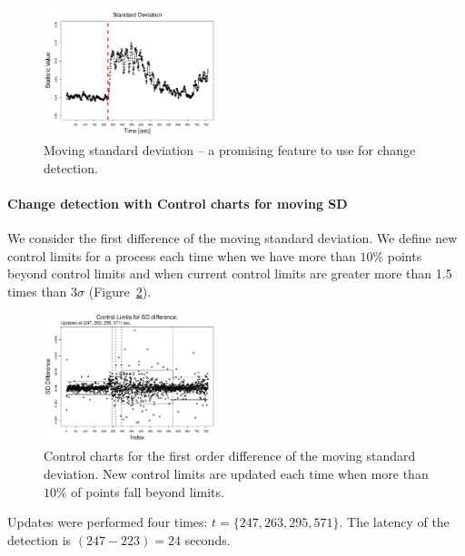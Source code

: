 \begin{figure}[htb!]
\includegraphics[width=0.45\textwidth]{articles/pics/cfb_paper/PSD/PSDsd}
\caption{Moving standard deviation -- a promising feature to use for change detection.}\label{figure9}
\end{figure}

\paragraph{Change detection with Control charts for moving SD}
We consider the first difference of the moving standard deviation.
We define new control limits for a process each time when we have more than $10\%$ points beyond control limits and
when current control limits are greater more than 1.5 times than $3\sigma$ (Figure~\ref{figure10}).

\begin{figure}[htb!]
\includegraphics[width=0.45\textwidth]{articles/pics/cfb_paper/PSD/PSDrunnqccSD}
\caption{Control charts for the first order difference of the moving standard deviation.
New control limits are updated each time when more than $10\%$ of points fall beyond limits.}\label{figure10}
\end{figure}

Updates were performed four times: $t=\{247, 263, 295, 571\}$. 
The latency of the detection is $(247-223)=24$ seconds.

